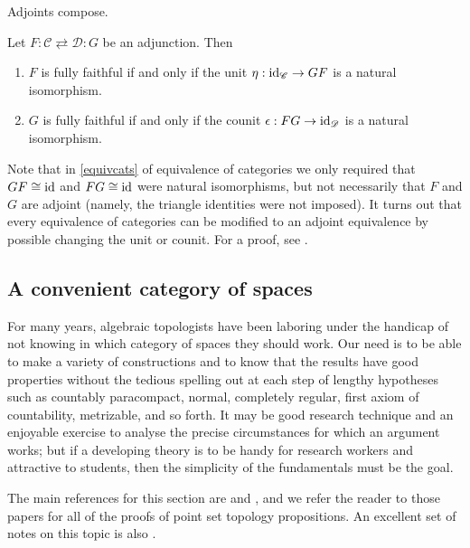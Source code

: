 \documentclass{article}[11pt]
\begin{document}
\begin{proposition} Adjoints compose.
\end{proposition}

\begin{exercise}\label{exer:left-adjoint-fully-faithful-iff-unit-natural-iso}
Let $F : \mathscr{C} \rightleftarrows \mathscr{D} : G$ be an adjunction. Then
\begin{enumerate}
    \item $F$ is fully faithful if and only if the unit $\eta: \text{id}_\mathscr{C} \to GF$ is a natural isomorphism.
    \item $G$ is fully faithful if and only if the counit $\epsilon : FG \to \text{id}_\mathscr{D}$ is a natural isomorphism.
\end{enumerate}

\end{exercise}



Note that in \autoref{equivcats} of equivalence of categories we only required that $GF\cong\text{id} $ and $FG\cong \text{id}$ were natural isomorphisms, but not necessarily that $F$ and $G$ are adjoint (namely, the triangle identities were not imposed). It turns out that every equivalence of categories can be modified to an adjoint equivalence by possible changing the unit or counit. For a proof, see \cite[Lemma 3.10]{mehrle}.


\subsection{A convenient category of spaces}

\epigraph{For many years, algebraic topologists have been laboring under the handicap of not knowing in which category of spaces they should work. Our need is to be able to make a variety of constructions and to know that the results have good properties without the tedious spelling out at each step of lengthy hypotheses such as countably paracompact, normal, completely regular, first axiom of countability, metrizable, and so forth. It may be good research technique and an enjoyable exercise to analyse the precise circumstances for which an argument works; but if a developing theory is to be handy for research workers and attractive to students, then the simplicity of the fundamentals must be the goal.}{\cite{Steenrod-convenient-cat}}

The main references for this section are \cite{Steenrod-convenient-cat} and \cite{Strickland-cgwh}, and we refer the reader to those papers for all of the proofs of point set topology propositions. An excellent set of notes on this topic is also \cite{martincgwh}.
\end{document}
